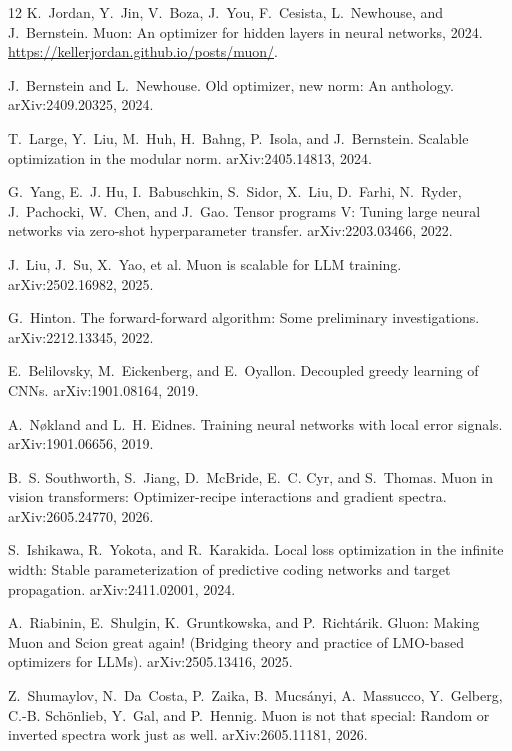 \documentclass[11pt]{article}
\begin{document}
\begin{thebibliography}{12}
K.~Jordan, Y.~Jin, V.~Boza, J.~You, F.~Cesista, L.~Newhouse, and J.~Bernstein.
\newblock Muon: An optimizer for hidden layers in neural networks, 2024.
\newblock \url{https://kellerjordan.github.io/posts/muon/}.

J.~Bernstein and L.~Newhouse.
\newblock Old optimizer, new norm: An anthology.
\newblock arXiv:2409.20325, 2024.

T.~Large, Y.~Liu, M.~Huh, H.~Bahng, P.~Isola, and J.~Bernstein.
\newblock Scalable optimization in the modular norm.
\newblock arXiv:2405.14813, 2024.

G.~Yang, E.~J. Hu, I.~Babuschkin, S.~Sidor, X.~Liu, D.~Farhi, N.~Ryder, J.~Pachocki, W.~Chen, and J.~Gao.
\newblock Tensor programs V: Tuning large neural networks via zero-shot hyperparameter transfer.
\newblock arXiv:2203.03466, 2022.

J.~Liu, J.~Su, X.~Yao, et al.
\newblock Muon is scalable for LLM training.
\newblock arXiv:2502.16982, 2025.

G.~Hinton.
\newblock The forward-forward algorithm: Some preliminary investigations.
\newblock arXiv:2212.13345, 2022.

E.~Belilovsky, M.~Eickenberg, and E.~Oyallon.
\newblock Decoupled greedy learning of CNNs.
\newblock arXiv:1901.08164, 2019.

A.~N{\o}kland and L.~H. Eidnes.
\newblock Training neural networks with local error signals.
\newblock arXiv:1901.06656, 2019.

B.~S. Southworth, S.~Jiang, D.~McBride, E.~C. Cyr, and S.~Thomas.
\newblock Muon in vision transformers: Optimizer-recipe interactions and gradient spectra.
\newblock arXiv:2605.24770, 2026.

S.~Ishikawa, R.~Yokota, and R.~Karakida.
\newblock Local loss optimization in the infinite width: Stable parameterization of predictive coding networks and target propagation.
\newblock arXiv:2411.02001, 2024.

A.~Riabinin, E.~Shulgin, K.~Gruntkowska, and P.~Richt\'arik.
\newblock Gluon: Making Muon and Scion great again! (Bridging theory and practice of LMO-based optimizers for LLMs).
\newblock arXiv:2505.13416, 2025.

Z.~Shumaylov, N.~Da~Costa, P.~Zaika, B.~Mucs\'anyi, A.~Massucco, Y.~Gelberg, C.-B. Sch\"onlieb, Y.~Gal, and P.~Hennig.
\newblock Muon is not that special: Random or inverted spectra work just as well.
\newblock arXiv:2605.11181, 2026.
\end{thebibliography}
\end{document}
